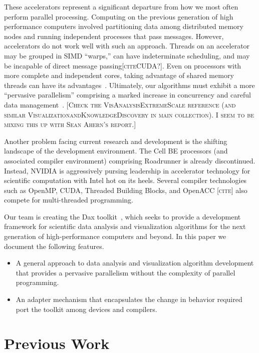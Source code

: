 \documentclass[conference]{IEEEtran}
\newcommand*{\lcite}[1]{~\cite{#1}}
\newcommand{\fix}[1]{{\color{red}\textsc{[#1]}}}
\begin{document}
These accelerators represent a significant departure from how we most often
perform parallel processing.  Computing on the previous generation of high
performance computers involved partitioning data among distributed memory
nodes and running independent processes that pass messages.  However,
accelerators do not work well with such an approach.  Threads on an
accelerator may be grouped in SIMD ``warps,'' can have indeterminate
scheduling, and may be incapable of direct message passing\fix{citeCUDA?}.
Even on processors with more complete and independent cores, taking
advantage of shared memory threads can have its
advantages\lcite{Camp2010,Howison2011}.  Ultimately, our algorithms must
exhibit a more ``pervasive parallelism'' comprising a marked increase in
concurrency and careful data
management\lcite{VisAnalysisExtremeScale,ExascaleRoadMap}. \fix{Check the
  VisAnalysisExtremeScale reference (and similar
  VisualizationandKnowledgeDiscovery in main collection).  I seem to be
  mixing this up with Sean Ahern's report.}

Another problem facing current research and development is the shifting
landscape of the development environment.  The Cell BE processors (and
associated compiler environment) comprising Roadrunner is already
discontinued.  Instead, NVIDIA is aggressively pursing leadership in
accelerator technology for scientific computation with Intel hot on its
heels.  Several compiler technologies such as OpenMP, CUDA, Threaded
Building Blocks, and OpenACC \fix{cite} also compete for multi-threaded
programming.

Our team is creating the Dax toolkit\lcite{Moreland2011:LDAV}, which seeks
to provide a development framework for scientific data analysis and
visualization algorithms for the next generation of high-performance
computers and beyond.  In this paper we document the following features.
\begin{itemize}
\item A general approach to data analysis and visualization algorithm
  development that provides a pervasive parallelism without the complexity
  of parallel programming.
\item An adapter mechanism that encapsulates the change in behavior
  required port the toolkit among devices and compilers.
\end{itemize}

\section{Previous Work}
\label{sec:PreviousWork}
\end{document}
